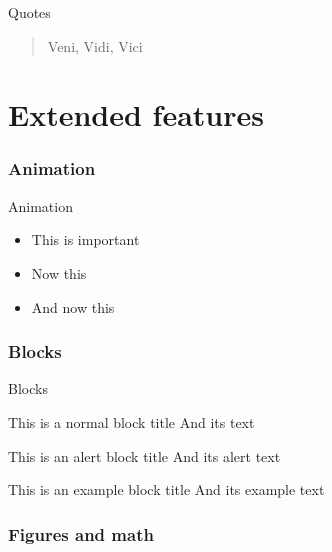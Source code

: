 \documentclass[aspectratio=169]{beamer}
\begin{document}
\begin{frame}{Quotes}
  \begin{quote}
    Veni, Vidi, Vici
  \end{quote}
\end{frame}

\part{Extended features}
\partpage

\section{Animation}

\begin{frame}{Animation}
  \begin{itemize}[<+- | alert@+>]
    \item \alert<4>{This is important}
    \item Now this
    \item And now this
  \end{itemize}
\end{frame}

\section{Blocks}

\begin{frame}{Blocks}
  \begin{block}{This is a normal block title}
	And its text
  \end{block}
  
  \begin{alertblock}{This is an alert block title}
	And its alert text
  \end{alertblock}
  
  \begin{exampleblock}{This is an example block title}
	And its example text
  \end{exampleblock}
\end{frame}

\section{Figures and math}
\end{document}
